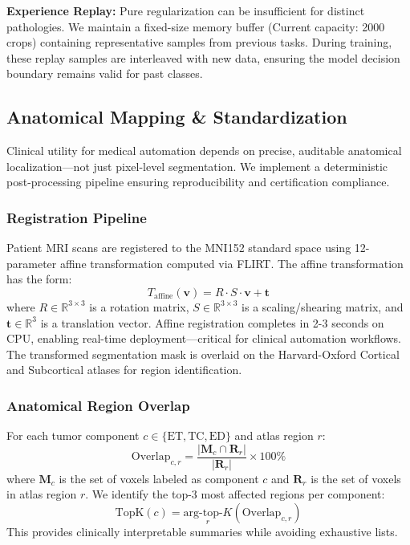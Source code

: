 \documentclass[conference]{IEEEtran}
\begin{document}
\textbf{Experience Replay:} Pure regularization can be insufficient for distinct pathologies. We maintain a fixed-size memory buffer (Current capacity: 2000 crops) containing representative samples from previous tasks. During training, these replay samples are interleaved with new data, ensuring the model decision boundary remains valid for past classes.

\subsection{Anatomical Mapping & Standardization}

Clinical utility for medical automation depends on precise, auditable anatomical localization—not just pixel-level segmentation. We implement a deterministic post-processing pipeline ensuring reproducibility and certification compliance.

\subsubsection{Registration Pipeline}
Patient MRI scans are registered to the MNI152 standard space using 12-parameter affine transformation computed via FLIRT. The affine transformation has the form:
\begin{equation}
T_{\text{affine}}(\mathbf{v}) = R \cdot S \cdot \mathbf{v} + \mathbf{t}
\end{equation}
where $R \in \mathbb{R}^{3 \times 3}$ is a rotation matrix, $S \in \mathbb{R}^{3 \times 3}$ is a scaling/shearing matrix, and $\mathbf{t} \in \mathbb{R}^3$ is a translation vector. Affine registration completes in 2-3 seconds on CPU, enabling real-time deployment—critical for clinical automation workflows. The transformed segmentation mask is overlaid on the Harvard-Oxford Cortical and Subcortical atlases for region identification.

\subsubsection{Anatomical Region Overlap}
For each tumor component $c \in \{\text{ET}, \text{TC}, \text{ED}\}$ and atlas region $r$:
\begin{equation}
\text{Overlap}_{c,r} = \frac{|\mathbf{M}_c \cap \mathbf{R}_r|}{|\mathbf{R}_r|} \times 100\%
\end{equation}
where $\mathbf{M}_c$ is the set of voxels labeled as component $c$ and $\mathbf{R}_r$ is the set of voxels in atlas region $r$. We identify the top-3 most affected regions per component:
\begin{equation}
\text{TopK}(c) = \underset{r}{\text{arg-top-}K} \left(\text{Overlap}_{c,r}\right)
\end{equation}
This provides clinically interpretable summaries while avoiding exhaustive lists.
\end{document}
